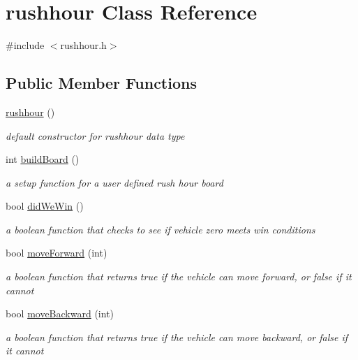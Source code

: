 \hypertarget{classrushhour}{}\section{rushhour Class Reference}
\label{classrushhour}


{\ttfamily \#include $<$rushhour.\+h$>$}

\subsection*{Public Member Functions}
\begin{DoxyCompactItemize}
\item 
\hyperlink{classrushhour_a07a4c6b194b30b6a3cbeb3957368b636}{rushhour} ()
\begin{DoxyCompactList}\small\item\em default constructor for rushhour data type \end{DoxyCompactList}\item 
int \hyperlink{classrushhour_ac9893ad0bd921df53cb3a1b8c298bbd9}{build\+Board} ()
\begin{DoxyCompactList}\small\item\em a setup function for a user defined rush hour board \end{DoxyCompactList}\item 
bool \hyperlink{classrushhour_aed525bf0c72f85adeb34c595af34dd78}{did\+We\+Win} ()
\begin{DoxyCompactList}\small\item\em a boolean function that checks to see if vehicle zero meets win conditions \end{DoxyCompactList}\item 
bool \hyperlink{classrushhour_a5377e3e2bf170e49c19021df612565cb}{move\+Forward} (int)
\begin{DoxyCompactList}\small\item\em a boolean function that returns true if the vehicle can move forward, or false if it cannot \end{DoxyCompactList}\item 
bool \hyperlink{classrushhour_a94bc7f8dcf697d41a28826a571ea2f04}{move\+Backward} (int)
\begin{DoxyCompactList}\small\item\em a boolean function that returns true if the vehicle can move backward, or false if it cannot \end{DoxyCompactList}\item 

\end{DoxyCompactItemize}

